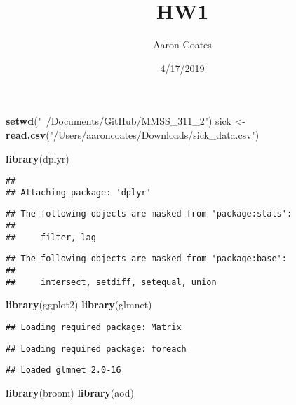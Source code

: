 \documentclass[]{article}
\title{HW1}
\author{Aaron Coates}
\date{4/17/2019}
\newenvironment{Shaded}{\begin{snugshade}}{\end{snugshade}}
\newcommand{\KeywordTok}[1]{\textcolor[rgb]{0.13,0.29,0.53}{\textbf{#1}}}
\newcommand{\StringTok}[1]{\textcolor[rgb]{0.31,0.60,0.02}{#1}}
\newcommand{\NormalTok}[1]{#1}
\begin{document}
\maketitle

\begin{Shaded}
\begin{Highlighting}[]
\KeywordTok{setwd}\NormalTok{(}\StringTok{"~/Documents/GitHub/MMSS_311_2"}\NormalTok{)}
\NormalTok{sick <-}\StringTok{ }\KeywordTok{read.csv}\NormalTok{(}\StringTok{"/Users/aaroncoates/Downloads/sick_data.csv"}\NormalTok{)}

\KeywordTok{library}\NormalTok{(dplyr)}
\end{Highlighting}
\end{Shaded}

\begin{verbatim}
## 
## Attaching package: 'dplyr'
\end{verbatim}

\begin{verbatim}
## The following objects are masked from 'package:stats':
## 
##     filter, lag
\end{verbatim}

\begin{verbatim}
## The following objects are masked from 'package:base':
## 
##     intersect, setdiff, setequal, union
\end{verbatim}

\begin{Shaded}
\begin{Highlighting}[]
\KeywordTok{library}\NormalTok{(ggplot2)}
\KeywordTok{library}\NormalTok{(glmnet)}
\end{Highlighting}
\end{Shaded}

\begin{verbatim}
## Loading required package: Matrix
\end{verbatim}

\begin{verbatim}
## Loading required package: foreach
\end{verbatim}

\begin{verbatim}
## Loaded glmnet 2.0-16
\end{verbatim}

\begin{Shaded}
\begin{Highlighting}[]
\KeywordTok{library}\NormalTok{(broom)}
\KeywordTok{library}\NormalTok{(aod)}
\end{Highlighting}
\end{Shaded}
\end{document}

